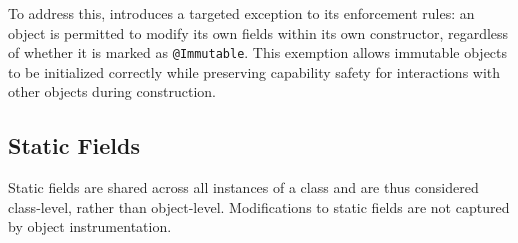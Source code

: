 To address this, \jdala introduces a targeted exception to its enforcement rules: an object is permitted to modify its own fields within its own constructor, regardless of whether it is marked as \texttt{@Immutable}. This exemption allows immutable objects to be initialized correctly while preserving capability safety for interactions with other objects during construction.

%
%
%
%


\subsection{Static Fields}
Static fields are shared across all instances of a class and are thus considered class-level, rather than object-level. Modifications to static fields are not captured by \jdala object instrumentation. 

